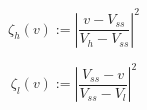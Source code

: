 \begin{equation}
	\zeta_h(v) := \left|\frac{v-V_{ss}}{V_h-V_{ss}}\right|^{2}
	\label{ch1:equ:high-voltage-threshold-cost-simple}
\end{equation}

\begin{equation}
	\zeta_l(v) := \left|\frac{V_{ss}-v}{V_{ss}-V_l}\right|^{2}
	\label{ch1:equ:low-voltage-threshold-cost-simple}
\end{equation}
